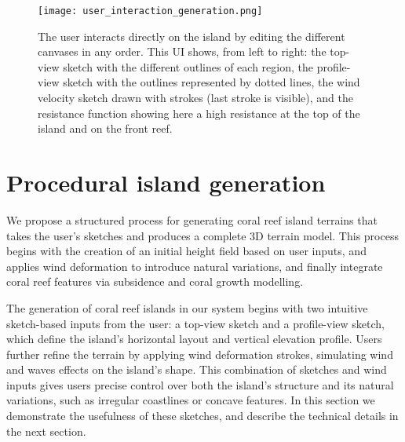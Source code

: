 \begin{figure}
    \texttt{[image: user\_interaction\_generation.png]}
    \caption{The user interacts directly on the island by editing the different canvases in any order. This UI shows, from left to right: the top-view sketch with the different outlines of each region, the profile-view sketch with the outlines represented by dotted lines, the wind velocity sketch drawn with strokes (last stroke is visible), and the resistance function showing here a high resistance at the top of the island and on the front reef.}
    \label{fig:coral-island-wind-from-strokes-interaction}
\end{figure}


























\section{Procedural island generation}
\label{sec:coral-island-example-generation}

We propose a structured process for generating coral reef island terrains that takes the user's sketches and produces a complete 3D terrain model. This process begins with the creation of an initial height field based on user inputs, and applies wind deformation to introduce natural variations, and finally integrate coral reef features via subsidence and coral growth modelling.

The generation of coral reef islands in our system begins with two intuitive sketch-based inputs from the user: a top-view sketch and a profile-view sketch, which define the island's horizontal layout and vertical elevation profile. Users further refine the terrain by applying wind deformation strokes, simulating wind and waves effects on the island's shape. This combination of sketches and wind inputs gives users precise control over both the island's structure and its natural variations, such as irregular coastlines or concave features. In this section we demonstrate the usefulness of these sketches, and describe the technical details in the next section.

